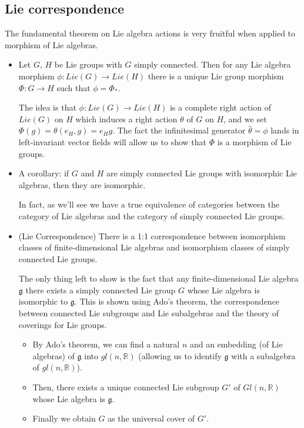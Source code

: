 \documentclass{report}
\theoremstyle{definition}
\begin{document}
\subsection{Lie correspondence}

The fundamental theorem on Lie algebra actions is very fruitful when applied to morphism of Lie algebras.

\begin{itemize}
    \item Let $G$, $H$ be Lie groups with $G$ simply connected. Then for any Lie algebra morphism $\phi:Lie(G)\to Lie(H)$ there is a unique Lie group morphism $\Phi:G\to H$ such that $\phi=\Phi_*$.

    The idea is that $\phi:Lie(G)\to Lie(H)$ is a complete right action of $Lie(G)$ on $H$ which induces a right action $\theta$ of $G$ on $H$, and we set $\Phi(g)=\theta(e_H,g)=e_Hg$. The fact the infinitesimal generator $\hat{\theta}=\phi$ lands in left-invariant vector fields will allow us to show that $\Phi$ is a morphism of Lie groups.
    \item A corollary: if $G$ and $H$ are simply connected Lie groups with isomorphic Lie algebras, then they are isomorphic.

    In fact, as we'll see we have a true equivalence of categories between the category of Lie algebras and the category of simply connected Lie groups.

    \item (Lie Correspondence) There is a 1:1 correspondence between isomorphism classes of finite-dimensional Lie algebras and isomorphism classes of simply connected Lie groups.

    The only thing left to show is the fact that any finite-dimensional Lie algebra $\mathfrak{g}$ there exists a simply connected Lie group $G$ whose Lie algebra is isomorphic to $\mathfrak{g}$. This is shown using Ado's theorem, the correspondence between connected Lie subgroups and Lie subalgebras and the theory of coverings for Lie groups.

    \begin{itemize}
        \item By Ado's theorem, we can find a natural $n$ and an embedding (of Lie algebras) of $\mathfrak{g}$ into $gl(n,\mathbb{R})$ (allowing us to identify $\mathfrak{g}$ with a subalgebra of $gl(n,\mathbb{R})$).
        \item Then, there exists a unique connected Lie subgroup $G'$ of $Gl(n,\mathbb{R})$ whose Lie algebra is $\mathfrak{g}$.
        \item Finally we obtain $G$ as the universal cover of $G'$.
    \end{itemize}
\end{itemize}
\end{document}
